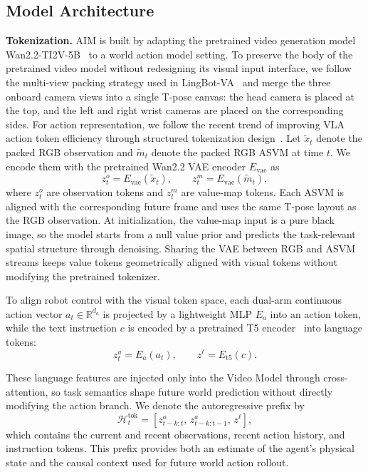 \documentclass{article}
\newcommand{\method}{AIM\xspace}
\begin{document}
\subsection{Model Architecture}
\noindent\textbf{Tokenization.} \method is built by adapting the pretrained video generation model Wan2.2-TI2V-5B~\cite{wan2025wan} to a world action model setting. To preserve the body of the pretrained video model without redesigning its visual input interface, we follow the multi-view packing strategy used in LingBot-VA~\cite{li2026causal} and merge the three onboard camera views into a single T-pose canvas: the head camera is placed at the top, and the left and right wrist cameras are placed on the corresponding sides. For action representation, we follow the recent trend of improving VLA action token efficiency through structured tokenization design~\cite{pertsch2025fast}. Let $\tilde{x}_t$ denote the packed RGB observation and $\tilde{m}_t$ denote the packed RGB ASVM at time $t$. We encode them with the pretrained Wan2.2 VAE encoder $E_{\mathrm{vae}}$ as
\begin{equation}
z_t^{o} = E_{\mathrm{vae}}(\tilde{x}_t), \qquad
z_t^{m} = E_{\mathrm{vae}}(\tilde{m}_t),
\end{equation}
where $z_t^{o}$ are observation tokens and $z_t^{m}$ are value-map tokens. Each ASVM is aligned with the corresponding future frame and uses the same T-pose layout as the RGB observation. At initialization, the value-map input is a pure black image, so the model starts from a null value prior and predicts the task-relevant spatial structure through denoising. Sharing the VAE between RGB and ASVM streams keeps value tokens geometrically aligned with visual tokens without modifying the pretrained tokenizer.

To align robot control with the visual token space, each dual-arm continuous action vector $a_t \in \mathbb{R}^{d_a}$ is projected by a lightweight MLP $E_a$ into an action token, while the text instruction $c$ is encoded by a pretrained T5 encoder~\cite{raffel2020t5} into language tokens:
\begin{equation}
z_t^{a} = E_a(a_t), \qquad z^{\ell} = E_{\mathrm{t5}}(c).
\end{equation}

These language features are injected only into the Video Model through cross-attention, so task semantics shape future world prediction without directly modifying the action branch. We denote the autoregressive prefix by
\begin{equation}
\mathcal{H}^{\mathrm{tok}}_t =
\left[z_{t-k:t}^{o},\, z_{t-k:t-1}^{a},\, z^{\ell}\right],
\end{equation}
which contains the current and recent observations, recent action history, and instruction tokens. This prefix provides both an estimate of the agent's physical state and the causal context used for future world action rollout.
\end{document}
